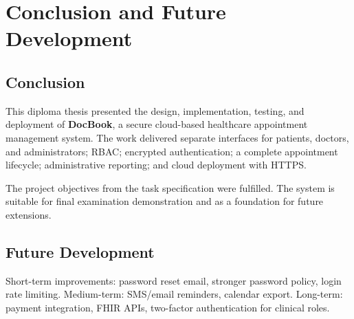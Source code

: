 \chapter{Conclusion and Future Development}

\section{Conclusion}

This diploma thesis presented the design, implementation, testing, and deployment of \textbf{DocBook}, a secure cloud-based healthcare appointment management system. The work delivered separate interfaces for patients, doctors, and administrators; RBAC; encrypted authentication; a complete appointment lifecycle; administrative reporting; and cloud deployment with HTTPS.

The project objectives from the task specification were fulfilled. The system is suitable for final examination demonstration and as a foundation for future extensions.

\section{Future Development}

Short-term improvements: password reset email, stronger password policy, login rate limiting. Medium-term: SMS/email reminders, calendar export. Long-term: payment integration, FHIR APIs, two-factor authentication for clinical roles.
